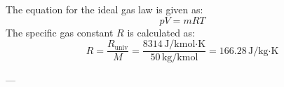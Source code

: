 The equation for the ideal gas law is given as:  
\[
pV = mRT
\]  
The specific gas constant \( R \) is calculated as:  
\[
R = \frac{R_{\text{univ}}}{M} = \frac{8314 \, \text{J/kmol·K}}{50 \, \text{kg/kmol}} = 166.28 \, \text{J/kg·K}
\]  

---
